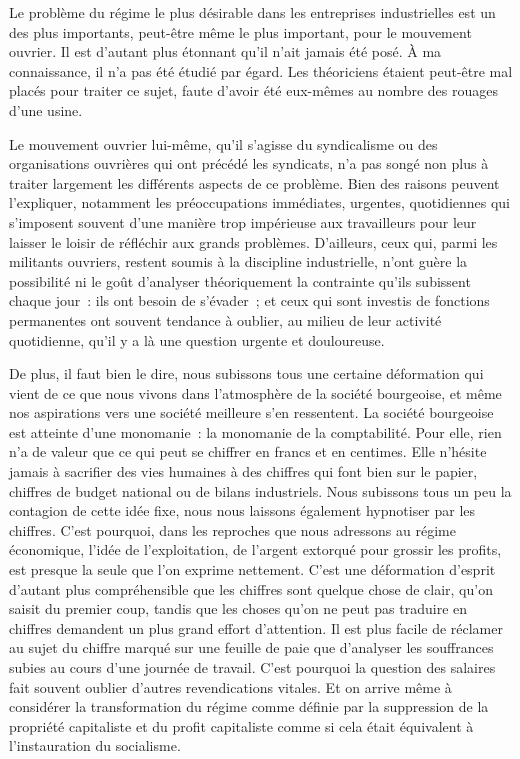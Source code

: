 \documentclass[french,twoside]{book} %
\begin{document}
Le problème du régime le plus désirable dans les entreprises industrielles est un des plus importants, peut-être même le plus important, pour le mouvement ouvrier. Il est d'autant plus étonnant qu'il n'ait jamais été posé. À ma connaissance, il n'a pas été étudié par égard. Les théoriciens étaient peut-être mal placés pour traiter ce sujet, faute d'avoir été eux-mêmes au nombre des rouages d'une usine.\par
Le mouvement ouvrier lui-même, qu'il s'agisse du syndicalisme ou des organisations ouvrières qui ont précédé les syndicats, n'a pas songé non plus à traiter largement les différents aspects de ce problème. Bien des raisons peuvent l'expliquer, notamment les préoccupations immédiates, urgentes, quotidiennes qui s'imposent souvent d'une manière trop impérieuse aux travailleurs pour leur laisser le loisir de réfléchir aux grands problèmes. D'ailleurs, ceux qui, parmi les militants ouvriers, restent soumis à la discipline industrielle, n'ont guère la possibilité ni le goût d'analyser théoriquement la contrainte qu'ils subissent chaque jour : ils ont besoin de s'évader ; et ceux qui sont investis de fonctions permanentes ont souvent tendance à oublier, au milieu de leur activité quotidienne, qu'il y a là une question urgente et douloureuse.\par
De plus, il faut bien le dire, nous subissons tous une certaine déformation qui vient de ce que nous vivons dans l'atmosphère de la société bourgeoise, et même nos aspirations vers une société meilleure s'en ressentent. La société bourgeoise est atteinte d'une monomanie : la monomanie de la comptabilité. Pour elle, rien n'a de valeur que ce qui peut se chiffrer en francs et en centimes. Elle n'hésite jamais à sacrifier des vies humaines à des chiffres qui font bien sur le papier, chiffres de budget national ou de bilans industriels. Nous subissons tous un peu la contagion de cette idée fixe, nous nous laissons également hypnotiser par les chiffres. C'est pourquoi, dans les reproches que nous adressons au régime économique, l'idée de l'exploitation, de l'argent extorqué pour grossir les profits, est presque la seule que l'on exprime nettement. C'est une déformation d'esprit d'autant plus compréhensible que les chiffres sont quelque chose de clair, qu'on saisit du premier coup, tandis que les choses qu'on ne peut pas traduire en chiffres demandent un plus grand effort d'attention. Il est plus facile de réclamer au sujet du chiffre marqué sur une feuille de paie que d'analyser les souffrances subies au cours d'une journée de travail. C'est pourquoi la question des salaires fait souvent oublier d'autres revendications vitales. Et on arrive même à considérer la transformation du régime comme définie par la suppression de la propriété capitaliste et du profit capitaliste comme si cela était équivalent à l'instauration du socialisme.\par
\end{document}
